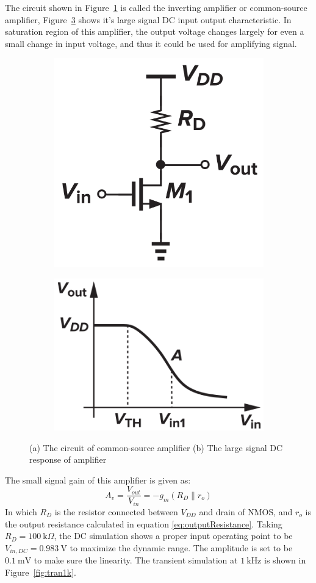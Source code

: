 \documentclass[12pt]{article}   %
\begin{document}
	The circuit shown in Figure~\ref{fig:invAmp} is called the inverting amplifier or common-source amplifier, Figure~\ref{fig:dcResponse} shows it's large signal DC input output characteristic. In saturation region of this amplifier, the output voltage changes largely for even a small change in input voltage, and thus it could be used for amplifying signal.
	\begin{figure}[htbp]
		\centering
		\begin{subfigure}[c]{0.48\linewidth}
			\centering
			\includegraphics[width=0.5\linewidth]{Figures/E2_Inverting_Amplifier/Inv_amp}
			\caption{}
			\label{fig:invAmp}
		\end{subfigure}
		\begin{subfigure}[c]{0.48\linewidth}
			\centering
			\includegraphics[width=0.7\linewidth]{Figures/E2_Inverting_Amplifier/DC_response}
			\caption{}
			\label{fig:dcResponse}
		\end{subfigure}
		\caption{(a) The circuit of common-source amplifier (b) The large signal DC response of amplifier\cite{razaviDesignAnalogCMOS2017}}
	\end{figure}
	
	The small signal gain of this amplifier is given as\cite{razaviDesignAnalogCMOS2017}:
	\begin{equation}
		A_v = \frac{V_{out}}{V_{in}} = -g_m \left(R_D \parallel r_o\right)
		\label{eq:invAmpGain}
	\end{equation}
	In which $R_{D}$ is the resistor connected between $V_{DD}$ and drain of NMOS, and $r_o$ is the output resistance calculated in equation \eqref{eq:outputResistance}. Taking $R_D = \SI{100}{\kilo\Omega}$, the DC simulation shows a proper input operating point to be $V_{in,DC} = \SI{0.983}{\volt}$ to maximize the dynamic range. The amplitude is set to be $\SI{0.1}{\milli\volt}$ to make sure the linearity. The transient simulation at $\SI{1}{\kilo\hertz}$ is shown in Figure~\ref{fig:tran1k}.
	
\end{document}
